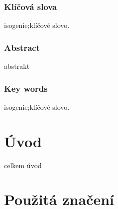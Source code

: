 \documentclass [12pt]{report}
\begin{document}
\subsection*{Klíčová slova}
isogenie;klíčové slovo.


\vspace*{4cm}

\subsection*{Abstract}
abstrakt

\subsection*{Key words}
isogenie;klíčové slovo.






\tableofcontents
\thispagestyle{empty}

\chapter*{Úvod}

celkem úvod





\chapter*{Použitá značení}
\end{document}
